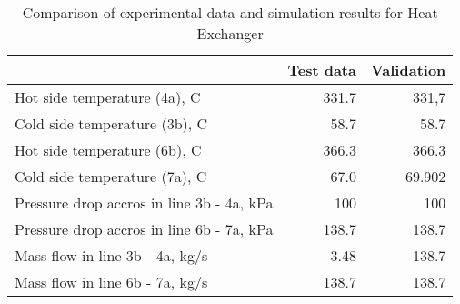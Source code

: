 \begin{table}
\label{tab:Comparison}
\caption{Comparison of experimental data and simulation results for Heat Exchanger}
\begin{center}
\begin{tabulary}{0.9\textwidth}{LRR}
\toprule
& Test data \cite{Iverson_2013}  & Validation \\
\midrule
Hot side temperature (4a), C & 331.7 & 331,7 \\
Cold side temperature (3b), C & 58.7 & 58.7 \\
Hot side temperature (6b), C & 366.3 & 366.3 \\
Cold side temperature (7a), C & 67.0 & 69.902 \\
Pressure drop accros in line 3b - 4a, kPa & 100 & 100 \\
Pressure drop accros in line 6b - 7a, kPa & 138.7 & 138.7 \\
Mass flow in line 3b - 4a, kg/s & 3.48 & 138.7 \\
Mass flow in line 6b - 7a, kg/s & 138.7 & 138.7 \\
\bottomrule
\end{tabulary}
\end{center}
\end{table}